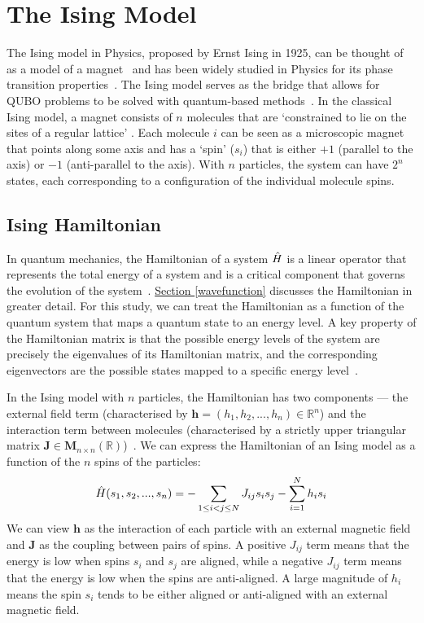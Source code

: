 \section{The Ising Model}
The Ising model in Physics, proposed by Ernst Ising in 1925, can be thought of as a model of a magnet~\cite{isingising} and has been widely studied in Physics for its phase transition properties~\cite{cipra1987introduction}. The Ising model serves as the bridge that allows for QUBO problems to be solved with quantum-based methods~\cite{b10}. In the classical Ising model, a magnet consists of $n$ molecules that are `constrained to lie on the sites of a regular lattice' \cite{b11}. Each molecule $i$ can be seen as a microscopic magnet that points along some axis and has a `spin' ($s_i$) that is either $+1$ (parallel to the axis) or $-1$ (anti-parallel to the axis). With $n$ particles, the system can have $2^n$ states, each corresponding to a configuration of the individual molecule spins.

\subsection{Ising Hamiltonian}\label{isinghamiltonian}
In quantum mechanics, the Hamiltonian of a system $\Hat{H}$ is a linear operator that represents the total energy of a system and is a critical component that governs the evolution of the system~\cite{GriffithsSchroeter2018}. \hyperref[wavefunction]{Section \ref{wavefunction}} discusses the Hamiltonian in greater detail. For this study, we can treat the Hamiltonian as a function of the quantum system that maps a quantum state to an energy level. A key property of the Hamiltonian matrix is that the possible energy levels of the system are precisely the eigenvalues of its Hamiltonian matrix, and the corresponding eigenvectors are the possible states mapped to a specific energy level~\cite{b21}. 

In the Ising model with $n$ particles, the Hamiltonian has two components --- the external field term (characterised by $\mathbf{h} = (h_1, h_2, ..., h_n) \in \mathbb{R}^n$) and the interaction term between molecules (characterised by a strictly upper triangular matrix $\mathbf{J} \in \boldsymbol{M}_{n\times n}(\mathbb{R})$)~\cite{b10}. We can express the Hamiltonian of an Ising model as a function of the $n$ spins of the particles:
\begin{equation}
    \Hat{H}(s_1, s_2, ... , s_n) = -\sum_{1\leq i < j \leq N} J_{ij}s_i s_j - \sum_{i=1}^N h_i s_i
\end{equation}
We can view $\mathbf{h}$ as the interaction of each particle with an external magnetic field and $\mathbf{J}$ as the coupling between pairs of spins. A positive $J_{ij}$ term means that the energy is low when spins $s_i$ and $s_j$ are aligned, while a negative $J_{ij}$ term means that the energy is low when the spins are anti-aligned. A large magnitude of $h_i$ means the spin $s_i$ tends to be either aligned or anti-aligned with an external magnetic field.

